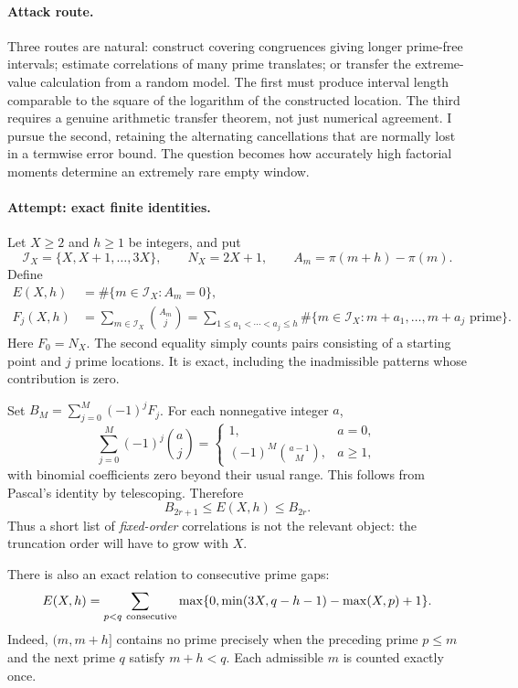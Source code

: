 \documentclass[11pt,a4paper]{article}
\numberwithin{equation}{section}
\begin{document}
\paragraph{Attack route.}
Three routes are natural: construct covering congruences giving longer
prime-free intervals; estimate correlations of many prime translates;
or transfer the extreme-value calculation from a random model. The first
must produce interval length comparable to the square of the logarithm
of the constructed location. The third requires a genuine arithmetic
transfer theorem, not just numerical agreement. I pursue the second,
retaining the alternating cancellations that are normally lost in a
termwise error bound. The question becomes how accurately high factorial
moments determine an extremely rare empty window.

\paragraph{Attempt: exact finite identities.}
Let $X\ge2$ and $h\ge1$ be integers, and put
\[
 \mathcal I_X=\{X,X+1,\ldots,3X\},\qquad N_X=2X+1,
 \qquad A_m=\pi(m+h)-\pi(m).
\]
Define
\begin{align}
 E(X,h)&=\#\{m\in\mathcal I_X:A_m=0\},\label{160:empty}\\
 F_j(X,h)&=\sum_{m\in\mathcal I_X}\binom{A_m}{j}
 =\sum_{1\le a_1<\cdots<a_j\le h}
   \#\{m\in\mathcal I_X:m+a_1,\ldots,m+a_j\text{ prime}\}.
 \label{160:factorial}
\end{align}
Here $F_0=N_X$. The second equality simply counts pairs consisting of a
starting point and $j$ prime locations. It is exact, including the
inadmissible patterns whose contribution is zero.

Set $B_M=\sum_{j=0}^M(-1)^jF_j$. For each nonnegative integer $a$,
\[
 \sum_{j=0}^M(-1)^j\binom aj=
 \begin{cases}
 1,&a=0,\\
 (-1)^M\binom{a-1}{M},&a\ge1,
 \end{cases}
\]
with binomial coefficients zero beyond their usual range. This follows
from Pascal's identity by telescoping. Therefore
\begin{equation}\label{160:bonferroni}
 B_{2r+1}\le E(X,h)\le B_{2r}.
\end{equation}
Thus a short list of \emph{fixed-order} correlations is not the relevant
object: the truncation order will have to grow with $X$.

There is also an exact relation to consecutive prime gaps:
\begin{equation}\label{160:gap-identity}
 E(X,h)=\sum_{p<q\ {\rm consecutive}}
 \max\{0,\min(3X,q-h-1)-\max(X,p)+1\}.
\end{equation}
Indeed, $(m,m+h]$ contains no prime precisely when the preceding prime
$p\le m$ and the next prime $q$ satisfy $m+h<q$. Each admissible $m$ is
counted exactly once.
\end{document}
